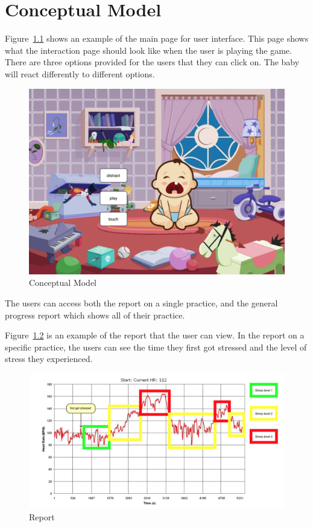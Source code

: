 \chapter{Conceptual Model}

Figure~\ref{fig:con-model} shows an example of the main page for user interface. This page shows what the interaction page should look like when the user is playing the game. There are three options provided for the users that they can click on. The baby will react differently to different options.

\begin{figure}[H]
    \centering
    \includegraphics[width=0.75\linewidth]{conceptual-model.png}
    \caption{Conceptual Model}
    \label{fig:con-model}
\end{figure}
The users can access both the report on a single practice, and the general progress report which shows all of their practice. 

Figure~\ref{fig:report} is an example of the report that the user can view. In the report on a specific practice, the users can see the time they first got stressed and the level of stress they experienced. 

\begin{figure}[H]
    \centering
    \includegraphics[width=0.75\linewidth]{heartrate.png}
    \caption{Report}
    \label{fig:report}
\end{figure}


